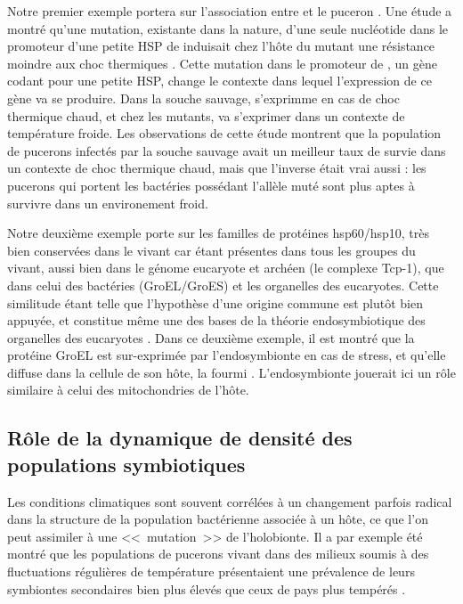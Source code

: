 Notre premier exemple portera sur l'association entre  et le puceron .
Une étude a montré qu'une mutation, existante dans la nature, d'une seule nucléotide dans le promoteur d'une petite HSP de  induisait chez l'hôte du mutant une résistance moindre aux choc thermiques \cite{dunbar2007}.
Cette mutation dans le promoteur de , un gène codant pour une petite HSP, change le contexte dans lequel l'expression de ce gène va se produire. Dans la souche sauvage,  s'exprimme en cas de choc thermique chaud, et chez les mutants,  va s'exprimer dans un contexte de température froide.
Les observations de cette étude montrent que la population de pucerons infectés par la souche sauvage avait un meilleur taux de survie dans un contexte de choc thermique chaud, mais que l'inverse était vrai aussi : les pucerons qui portent les bactéries possédant l'allèle muté sont plus aptes à survivre dans un environement froid.

Notre deuxième exemple porte sur les familles de protéines hsp60/hsp10, très bien conservées dans le vivant car étant présentes dans tous les groupes du vivant, aussi bien dans le génome eucaryote et archéen (le complexe Tcp-1), que dans celui des bactéries (GroEL/GroES) et les organelles des eucaryotes.
Cette similitude étant telle que l'hypothèse d'une origine commune est plutôt bien appuyée, et constitue même une des bases de la théorie endosymbiotique des organelles des eucaryotes \cite{gupta1995}.
Dans ce deuxième exemple, il est montré que la protéine GroEL est sur-exprimée par l'endosymbionte  en cas de stress, et qu'elle diffuse dans la cellule de son hôte, la fourmi  \cite{stoll2009}.
L'endosymbionte jouerait ici un rôle similaire à celui des mitochondries de l'hôte.

\subsection{Rôle de la dynamique de densité des populations symbiotiques}

Les conditions climatiques sont souvent corrélées à un changement parfois radical dans la structure de la population bactérienne associée à un hôte, ce que l'on peut assimiler à une <<~mutation~>> de l'holobionte.
Il a par exemple été montré que les populations de pucerons vivant dans des milieux soumis à des fluctuations régulières de température présentaient une prévalence de leurs symbiontes secondaires bien plus élevés que ceux de pays plus tempérés \cite{harmon2009}.


